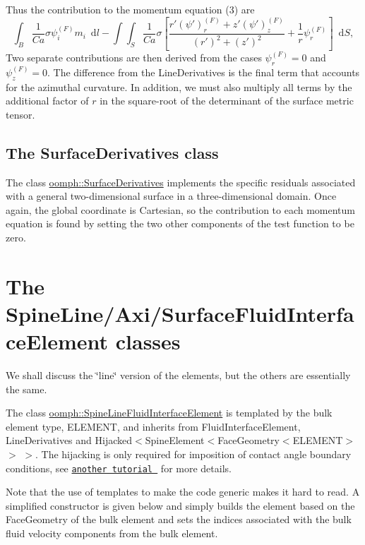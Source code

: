 Thus the contribution to the momentum equation (3) are \[ \int_{B} \frac{1}{Ca} \sigma \psi_{i}^{(F)} m_{i}\,\mbox{ d}l - \int\!\!\!\int_{S} \frac{1}{Ca} \sigma \left[\frac{r' (\psi')_{r}^{(F)} + z' (\psi')_{z}^{(F)}}{(r')^{2} + (z')^2} + \frac{1}{r} \psi_{r}^{(F)}\right]\, \mbox{ d}S, \] Two separate contributions are then derived from the cases $ \psi_{r}^{(F)} = 0 $ and $ \psi_{z}^{(F)} = 0$. The difference from the {\ttfamily Line\+Derivatives} is the final term that accounts for the azimuthal curvature. In addition, we must also multiply all terms by the additional factor of $ r$ in the square-\/root of the determinant of the surface metric tensor.\hypertarget{index_surface}{}\subsection{The Surface\+Derivatives class}\label{index_surface}
The class \hyperlink{classoomph_1_1SurfaceDerivatives}{oomph\+::\+Surface\+Derivatives} implements the specific residuals associated with a general two-\/dimensional surface in a three-\/dimensional domain. Once again, the global coordinate is Cartesian, so the contribution to each momentum equation is found by setting the two other components of the test function to be zero.



\hypertarget{index_spine_formulation}{}\section{The Spine\+Line/\+Axi/\+Surface\+Fluid\+Interface\+Element classes}\label{index_spine_formulation}
We shall discuss the \char`\"{}line\char`\"{} version of the elements, but the others are essentially the same.

The class \hyperlink{classoomph_1_1SpineLineFluidInterfaceElement}{oomph\+::\+Spine\+Line\+Fluid\+Interface\+Element} is templated by the bulk element type, {\ttfamily E\+L\+E\+M\+E\+NT}, and inherits from {\ttfamily Fluid\+Interface\+Element}, Line\+Derivatives and {\ttfamily Hijacked$<$Spine\+Element$<$Face\+Geometry$<$\+E\+L\+E\+M\+E\+N\+T$>$} $>$ $>$. The hijacking is only required for imposition of contact angle boundary conditions, see \href{../../static_single_layer/html/index.html}{\tt another tutorial } for more details.

Note that the use of templates to make the code generic makes it hard to read. A simplified constructor is given below and simply builds the element based on the {\ttfamily Face\+Geometry} of the bulk element and sets the indices associated with the bulk fluid velocity components from the bulk element.

